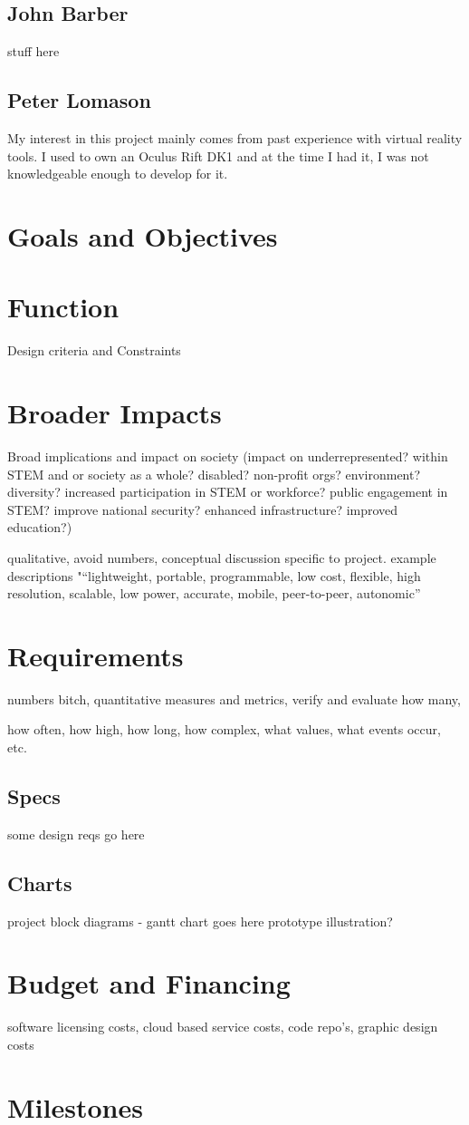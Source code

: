 \documentclass[a4paper,10pt]{article}
\begin{document}
\subsection{John Barber}
stuff here
\subsection{Peter Lomason}
My interest in this project mainly comes from past experience with virtual reality tools. I used to own an Oculus Rift DK1 and at the time I had it, I was not knowledgeable enough to develop for it. 
\section{Goals and Objectives}
\section{Function}
Design criteria and Constraints
\section{Broader Impacts}
Broad implications and impact on society (impact on underrepresented? within STEM and or society as a whole? disabled? non-profit orgs? environment? diversity? increased participation in STEM or workforce? public engagement in STEM? improve national security? enhanced infrastructure? improved education?)

qualitative, avoid numbers, conceptual discussion specific to project.
example descriptions "“lightweight, portable, programmable, low cost, flexible, high resolution, scalable, low power, accurate, mobile, peer-to-peer, autonomic”


\section{Requirements}
numbers bitch, quantitative measures and metrics, verify and evaluate
how many,

how often, how high, how long, how complex, what values, what events occur, etc.
\subsection{Specs}
some design reqs go here
\subsection{Charts}
project block diagrams - gantt chart goes here
prototype illustration?

\section{Budget and Financing}
software licensing costs, cloud based service costs, code repo's, graphic design costs
\section{Milestones}
\end{document}
